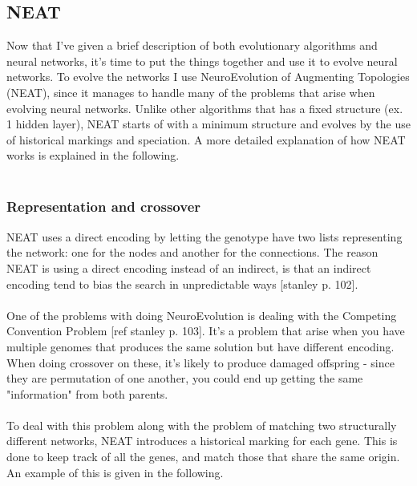 \documentclass[11pt, a4paper]{article}
\begin{document}
\subsection{NEAT}
Now that I've given a brief description of both evolutionary algorithms and neural networks, it's time to put the things together and use it to evolve neural networks. To evolve the networks I use NeuroEvolution of Augmenting Topologies (NEAT), since it manages to handle many of the problems that arise when evolving neural networks. Unlike other algorithms that has a fixed structure (ex. 1 hidden layer), NEAT starts of with a minimum structure and evolves by the use of historical markings and speciation. A more detailed explanation of how NEAT works is explained in the following.
\\
\\
\subsubsection{Representation and crossover}
NEAT uses a direct encoding by letting the genotype have two lists representing the network: one for the nodes and another for the connections. The reason NEAT is using a direct encoding instead of an indirect, is that an indirect encoding tend to bias the search in unpredictable ways [stanley p. 102].
\\
\\
One of the problems with doing NeuroEvolution is dealing with the Competing Convention Problem [ref stanley p. 103]. It's a problem that arise when you have multiple genomes that produces the same solution but have different encoding. When doing crossover on these, it's likely to produce damaged offspring - since they are permutation of one another, you could end up getting the same "information" from both parents.
\\
\\
To deal with this problem along with the problem of matching two structurally different networks, NEAT introduces a historical marking for each gene. This is done to keep track of all the genes, and match those that share the same origin. An example of this is given in the following.
\end{document}
